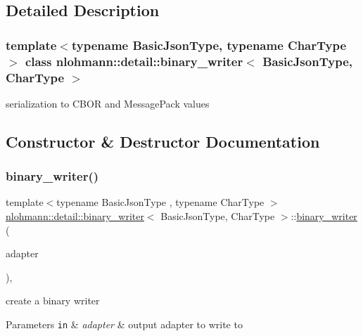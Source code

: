 \subsection{Detailed Description}
\subsubsection*{template$<$typename Basic\+Json\+Type, typename Char\+Type$>$\newline
class nlohmann\+::detail\+::binary\+\_\+writer$<$ Basic\+Json\+Type, Char\+Type $>$}

serialization to C\+B\+OR and Message\+Pack values 

\subsection{Constructor \& Destructor Documentation}
\mbox{\label{classnlohmann_1_1detail_1_1binary__writer_a373289af95a946c19bb4a58a5df71a78}} 
\subsubsection{\texorpdfstring{binary\+\_\+writer()}{binary\_writer()}}
{\footnotesize\ttfamily template$<$typename Basic\+Json\+Type , typename Char\+Type $>$ \\
\hyperlink{classnlohmann_1_1detail_1_1binary__writer}{nlohmann\+::detail\+::binary\+\_\+writer}$<$ Basic\+Json\+Type, Char\+Type $>$\+::\hyperlink{classnlohmann_1_1detail_1_1binary__writer}{binary\+\_\+writer} (\begin{DoxyParamCaption}\item[{\hyperlink{namespacenlohmann_1_1detail_a9b680ddfb58f27eb53a67229447fc556}{output\+\_\+adapter\+\_\+t}$<$ Char\+Type $>$}]{adapter }\end{DoxyParamCaption})\hspace{0.3cm}{\ttfamily [inline]}, {\ttfamily [explicit]}}



create a binary writer 


\begin{DoxyParams}[1]{Parameters}
\mbox{\tt in}  & {\em adapter} & output adapter to write to \\
\hline
\end{DoxyParams}


